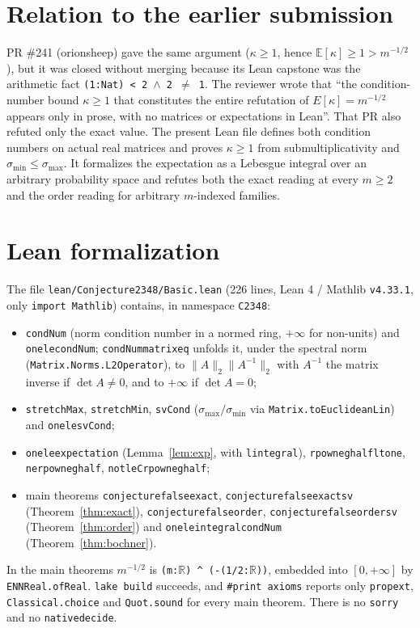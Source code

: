 \documentclass[11pt]{article}
\renewcommand{\_}{\oldus\allowbreak}
\theoremstyle{definition}
\theoremstyle{remark}
\begin{document}
\section{Relation to the earlier submission}

PR \#241 (orionsheep) gave the same argument ($\kappa\ge1$, hence $\mathbb{E}[\kappa]\ge1>m^{-1/2}$),
but it was closed without merging because its Lean capstone was the arithmetic fact
\texttt{(1:Nat) < 2 $\wedge$ 2 $\ne$ 1}. The reviewer wrote that ``the condition-number bound
$\kappa\ge1$ that constitutes the entire refutation of $E[\kappa]=m^{-1/2}$ appears only in prose, with no
matrices or expectations in Lean''. That PR also refuted only the exact value. The present Lean file
defines both condition numbers on actual real matrices and proves $\kappa\ge 1$ from submultiplicativity
and $\sigma_{\min}\le\sigma_{\max}$. It formalizes the expectation as a Lebesgue integral over an
arbitrary probability space and refutes both the exact reading at every $m\ge2$ and the order reading
for arbitrary $m$-indexed families.

\section{Lean formalization}

The file \texttt{lean/Conjecture2348/Basic.lean} (226 lines, Lean 4 / Mathlib \texttt{v4.33.1}, only
\texttt{import Mathlib}) contains, in namespace \texttt{C2348}:
\begin{itemize}
\item \texttt{condNum} (norm condition number in a normed ring, $+\infty$ for non-units) and
\texttt{one\_le\_condNum}; \texttt{condNum\_matrix\_eq} unfolds it, under the spectral norm
(\texttt{Matrix.Norms.L2Operator}), to $\|A\|_2\|A^{-1}\|_2$ with $A^{-1}$ the matrix inverse if
$\det A\ne0$, and to $+\infty$ if $\det A=0$;
\item \texttt{stretchMax}, \texttt{stretchMin}, \texttt{svCond} ($\sigma_{\max}/\sigma_{\min}$ via
\texttt{Matrix.toEuclideanLin}) and \texttt{one\_le\_svCond};
\item \texttt{one\_le\_expectation} (Lemma~\ref{lem:exp}, with \texttt{lintegral}),
\texttt{rpow\_neg\_half\_lt\_one}, \texttt{ne\_rpow\_neg\_half}, \texttt{not\_le\_C\_rpow\_neg\_half};
\item main theorems \texttt{conjecture\_2348\_false\_exact}, \texttt{conjecture\_2348\_false\_exact\_sv}
(Theorem~\ref{thm:exact}), \texttt{conjecture\_2348\_false\_order},
\texttt{conjecture\_2348\_false\_order\_sv} (Theorem~\ref{thm:order}) and
\texttt{one\_le\_integral\_condNum} (Theorem~\ref{thm:bochner}).
\end{itemize}
In the main theorems $m^{-1/2}$ is \texttt{(m:$\mathbb{R}$) \^{} (-(1/2:$\mathbb{R}$))}, embedded into
$[0,+\infty]$ by \texttt{ENNReal.ofReal}. \texttt{lake build} succeeds, and \texttt{\#print axioms} reports
only \texttt{propext}, \texttt{Classical.choice} and \texttt{Quot.sound} for every main theorem. There
is no \texttt{sorry} and no \texttt{native\_decide}.
\end{document}
